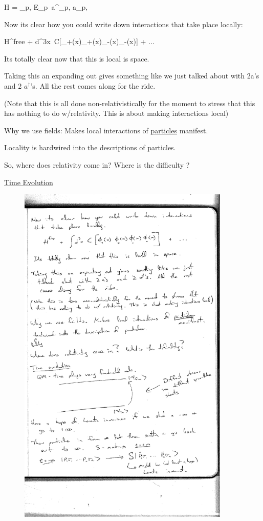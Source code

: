 {\be
H = \sum\limits_{p,\sigma} E_p\ a^\dagger_{p,\sigma} a_{p,\sigma}
\ee


Now its clear how you could write down interactions that take place locally:

\be
\textrm{H}^{\textrm{free}} + \int d^3x\ C[\phi_+(x)\phi_+(x)\phi_-(x)\phi_-(x)] + ... 
\ee

Its totally clear now that this is local is space. 

Taking this an expanding out gives something like we just talked about with 2a's and 2 $a^\dagger$'s.
All the rest comes along for the ride. 

(Note that this is all done non-relativistically for the moment to stress that this has nothing to do w/relativity.
This is about making interactions local)

Why we use fields: Makes local interactions of \underline{particles} manifest.

Locality is hardwired into the descriptions of particles.

So, where does relativity come in?  Where is the difficulty ?

\underline{Time Evolution}

\begin{figure}[h]
\centering
\includegraphics[width=0.9\textwidth]{./TimeEvolution.pdf}
\end{figure}

}
